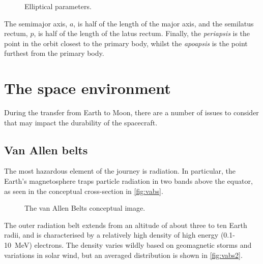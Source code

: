 \begin{figure} 
\caption{Elliptical parameters.} \label{fig:ellipse}
\centering
\def\svgwidth{0.6\textwidth}

\end{figure}

The semimajor axis, $a$, is half of the length of the major axis, and the semilatus rectum, $p$, is half of the length of the latus rectum. Finally, the \emph{periapsis} is the point in the orbit closest to the primary body, whilst the \emph{apoapsis} is the point furthest from the primary body.


\section{The space environment} \label{sec:Environment}

During the transfer from Earth to Moon, there are a number of issues to consider that may impact the durability of the spacecraft.

\subsection{Van Allen belts} \label{sub:VABs}

The most hazardous element of the journey is radiation. In particular, the Earth's magnetosphere traps particle radiation in two bands above the equator, as seen in the conceptual cross-section in \autoref{fig:vabs}. 

\begin{figure}
\caption{The van Allen Belts conceptual image.} \label{fig:vabs}
\centering
\def\svgwidth{\figurewidth}

\end{figure}

The outer radiation belt extends from an altitude of about three to ten Earth radii, and is characterised by a relatively high density of high energy (0.1-10~MeV) electrons. The density varies wildly based on geomagnetic storms and variations in solar wind, but an averaged distribution is shown in \autoref{fig:vabs2}.


